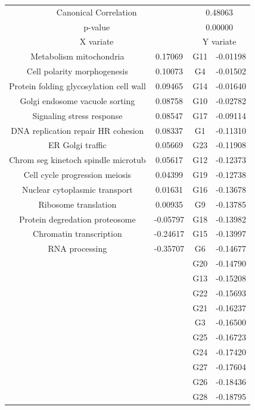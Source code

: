 

\begin{figure}[H]
\centering
\begin{tabular}{ c c | c c }
  \multicolumn{2}{c}{Canonical Correlation} &  \multicolumn{2}{c}{0.48063} \\
  \multicolumn{2}{c}{p-value} &  \multicolumn{2}{c}{0.00000} \\
  \hline
  \multicolumn{2}{c}{X variate} & \multicolumn{2}{c}{Y variate}\\
  \hline
 Metabolism mitochondria & 0.17069 &  G11 & -0.01198\\
 Cell polarity morphogenesis & 0.10073 &  G4 & -0.01502\\
 Protein folding   glycosylation cell wall & 0.09465 &  G14 & -0.01640\\
 Golgi endosome vacuole sorting & 0.08758 &  G10 & -0.02782\\
 Signaling stress response & 0.08547 &  G17 & -0.09114\\
 DNA replication   repair HR cohesion & 0.08337 &  G1 & -0.11310\\
 ER Golgi traffic & 0.05669 &  G23 & -0.11908\\
 Chrom  seg  kinetoch  spindle microtub  & 0.05617 &  G12 & -0.12373\\
 Cell cycle progression meiosis & 0.04399 &  G19 & -0.12738\\
 Nuclear cytoplasmic transport & 0.01631 &  G16 & -0.13678\\
 Ribosome translation & 0.00935 &  G9 & -0.13785\\
 Protein degredation proteosome & -0.05797 &  G18 & -0.13982\\
 Chromatin transcription & -0.24617 &  G15 & -0.13997\\
 RNA processing & -0.35707 &  G6 & -0.14677\\
 & &  G20 & -0.14790\\
 & &  G13 & -0.15208\\
 & &  G22 & -0.15693\\
 & &  G21 & -0.16237\\
 & &  G3 & -0.16500\\
 & &  G25 & -0.16723\\
 & &  G24 & -0.17420\\
 & &  G27 & -0.17604\\
 & &  G26 & -0.18436\\
 & &  G28 & -0.18795\\

\end{tabular}
\end{figure}
